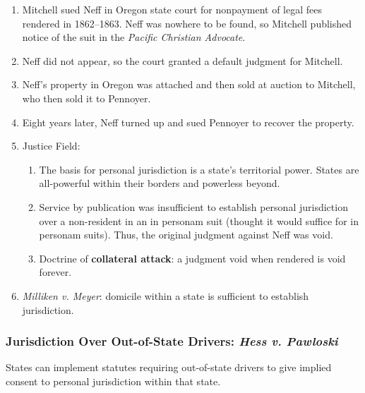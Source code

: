 \begin{enumerate}
    \item Mitchell sued Neff in Oregon state court for nonpayment of legal 
    fees rendered in 1862--1863. Neff was nowhere to be found, so Mitchell 
    published notice of the suit in the \emph{Pacific Christian Advocate}.
    \item Neff did not appear, so the court granted a default judgment for 
    Mitchell.
    \item Neff's property in Oregon was attached and then sold at auction to 
    Mitchell, who then sold it to Pennoyer.
    \item Eight years later, Neff turned up and sued Pennoyer to recover the 
    property.
    \item Justice Field:
    \begin{enumerate}
        \item The basis for personal jurisdiction is a state's territorial 
        power. States are all-powerful within their borders and powerless 
        beyond.
        \item Service by publication was insufficient to establish personal 
        jurisdiction over a non-resident in an in personam suit (thought it 
        would suffice for in personam suits). Thus, the original judgment 
        against Neff was void.
        \item Doctrine of \textbf{collateral attack}: a judgment void when 
        rendered is void forever.
    \end{enumerate}
    \item \emph{Milliken v. Meyer}: domicile within a state is sufficient to 
    establish jurisdiction.
\end{enumerate}

\subsubsection{Jurisdiction Over Out-of-State Drivers: \emph{Hess v.  
Pawloski}}

States can implement statutes requiring out-of-state drivers to give implied 
consent to personal jurisdiction within that state.

